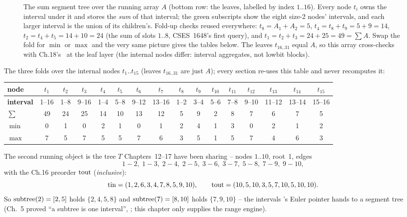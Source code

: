 \begin{figure}[H]
\begin{tikzpicture}[diagram, scale=0.46, transform shape]
\end{tikzpicture}
\caption{The sum segment tree over the running array \(A\) (bottom row: the
leaves, labelled by index \(1..16\)).  Every node \(t_i\) owns the interval
under it and stores the \emph{sum} of that interval; the green subscripts show
the eight size-2 nodes' intervals, and each larger interval is the union of its
children's.  Fold-up checks reused everywhere:
\(t_8{=}A_1{+}A_2{=}5\), \(t_4{=}t_8{+}t_9{=}5{+}9{=}14\),
\(t_2{=}t_4{+}t_5{=}14{+}10{=}24\) (the sum of slots \(1..8\), CSES~1648's first
query), and \(t_1{=}t_2{+}t_3{=}24{+}25{=}49=\sum A\).  Swap the fold for
\(\min\) or \(\max\) and the very same picture gives the tables below.  The
leaves \(t_{16..31}\) equal \(A\), so this array cross-checks with
Ch.18's~ at the leaf layer (the internal nodes differ:
interval aggregates, not lowbit blocks).}
\label{fig:c13-tree}
\end{figure}

The three folds over the internal nodes \(t_1..t_{15}\) (leaves \(t_{16..31}\)
are just \(A\)); every section re-uses this table and never recomputes it:

\begin{center}
\scriptsize
\renewcommand{\arraystretch}{1.1}
\setlength{\tabcolsep}{3pt}
\begin{tabular}{@{}l|cccc|cccc|ccccccc@{}}
\toprule
\textbf{node} & \(t_1\)&\(t_2\)&\(t_3\)&\(t_4\) & \(t_5\)&\(t_6\)&\(t_7\)&\(t_8\) & \(t_9\)&\(t_{10}\)&\(t_{11}\)&\(t_{12}\)&\(t_{13}\)&\(t_{14}\)&\(t_{15}\)\\
\midrule
\textbf{interval} & 1--16&1--8&9--16&1--4 & 5--8&9--12&13--16&1--2 & 3--4&5--6&7--8&9--10&11--12&13--14&15--16\\
\(\sum\) & 49&24&25&14 & 10&13&12&5 & 9&2&8&7&6&7&5\\
\(\min\) & 0&1&0&2 & 1&0&1&2 & 4&1&3&0&2&1&2\\
\(\max\) & 7&5&7&5 & 5&7&6&3 & 5&1&5&7&4&6&3\\
\bottomrule
\end{tabular}
\end{center}

The second running object is the tree \(T\) Chapters~12--17 have been sharing
-- nodes \(1..10\), root~1, edges
\[
  1\!-\!2,\; 1\!-\!3,\; 2\!-\!4,\; 2\!-\!5,\; 3\!-\!6,\;
  3\!-\!7,\; 5\!-\!8,\; 7\!-\!9,\; 9\!-\!10 ,
\]
with the Ch.16 preorder \(\operatorname{tout}\) (\emph{inclusive}):
\[
  \operatorname{tin}=(1,2,6,3,4,7,8,5,9,10),\qquad
  \operatorname{tout}=(10,5,10,3,5,7,10,5,10,10).
\]
So \(\operatorname{subtree}(2)=[2,5]\) holds \(\{2,4,5,8\}\) and \(\operatorname{subtree}(7)=[8,10]\)
holds \(\{7,9,10\}\) -- the intervals 's Euler pointer hands
to a segment tree (Ch.~5 proved ``a subtree is one interval'',
; this chapter only supplies the range engine).

